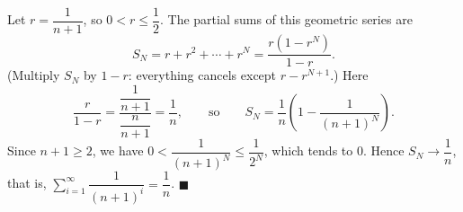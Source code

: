 Let $r=\dfrac{1}{n+1}$, so $0<r\le\dfrac{1}{2}$. The partial sums of this geometric series are
\[S_N=r+r^2+\cdots+r^N=\dfrac{r\left(1-r^N\right)}{1-r}.\]
(Multiply $S_N$ by $1-r$: everything cancels except $r-r^{N+1}$.) Here
\[\dfrac{r}{1-r}=\dfrac{\dfrac{1}{n+1}}{\dfrac{n}{n+1}}=\dfrac{1}{n},\qquad\text{so}\qquad S_N=\dfrac{1}{n}\left(1-\dfrac{1}{(n+1)^N}\right).\]
Since $n+1\ge2$, we have $0<\dfrac{1}{(n+1)^N}\le\dfrac{1}{2^N}$, which tends to $0$. Hence $S_N\to\dfrac{1}{n}$, that is, $\displaystyle\sum_{i=1}^{\infty}\dfrac{1}{(n+1)^i}=\dfrac{1}{n}$. $\blacksquare$
